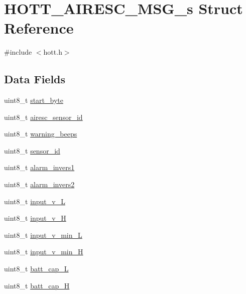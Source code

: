 \hypertarget{structHOTT__AIRESC__MSG__s}{\section{H\+O\+T\+T\+\_\+\+A\+I\+R\+E\+S\+C\+\_\+\+M\+S\+G\+\_\+s Struct Reference}
\label{structHOTT__AIRESC__MSG__s}
}


{\ttfamily \#include $<$hott.\+h$>$}

\subsection*{Data Fields}
\begin{DoxyCompactItemize}
\item 
uint8\+\_\+t \hyperlink{structHOTT__AIRESC__MSG__s_a2e1b4d959dc59975a7b24e03731f8caa}{start\+\_\+byte}
\item 
uint8\+\_\+t \hyperlink{structHOTT__AIRESC__MSG__s_a07fcdc5234d5d869dda5d89801cb77ab}{airesc\+\_\+sensor\+\_\+id}
\item 
uint8\+\_\+t \hyperlink{structHOTT__AIRESC__MSG__s_aa3ffd7a6b09a92f9d7f6ce1ba4c71c95}{warning\+\_\+beeps}
\item 
uint8\+\_\+t \hyperlink{structHOTT__AIRESC__MSG__s_a331337f5fe9c73fc739f7040aebcebc0}{sensor\+\_\+id}
\item 
uint8\+\_\+t \hyperlink{structHOTT__AIRESC__MSG__s_a07c0dcb740e4399e31c39bc60bb18850}{alarm\+\_\+invers1}
\item 
uint8\+\_\+t \hyperlink{structHOTT__AIRESC__MSG__s_a8382b78cc1aa9763ef8518e4d9df9d91}{alarm\+\_\+invers2}
\item 
uint8\+\_\+t \hyperlink{structHOTT__AIRESC__MSG__s_a5f7e3a28cc7b17ab36f5a01ad810554b}{input\+\_\+v\+\_\+\+L}
\item 
uint8\+\_\+t \hyperlink{structHOTT__AIRESC__MSG__s_a2db645d68a21db3ae09a6fecd524d902}{input\+\_\+v\+\_\+\+H}
\item 
uint8\+\_\+t \hyperlink{structHOTT__AIRESC__MSG__s_abe7dedc82428352222d1294f4d6e35e6}{input\+\_\+v\+\_\+min\+\_\+\+L}
\item 
uint8\+\_\+t \hyperlink{structHOTT__AIRESC__MSG__s_a482afee392c74ba95779422532db1d54}{input\+\_\+v\+\_\+min\+\_\+\+H}
\item 
uint8\+\_\+t \hyperlink{structHOTT__AIRESC__MSG__s_a7434d43e622a771f914fed3adf9920e6}{batt\+\_\+cap\+\_\+\+L}
\item 
uint8\+\_\+t \hyperlink{structHOTT__AIRESC__MSG__s_a0f8f41e511b4937ac967c8956e8090f8}{batt\+\_\+cap\+\_\+\+H}

\end{DoxyCompactItemize}
